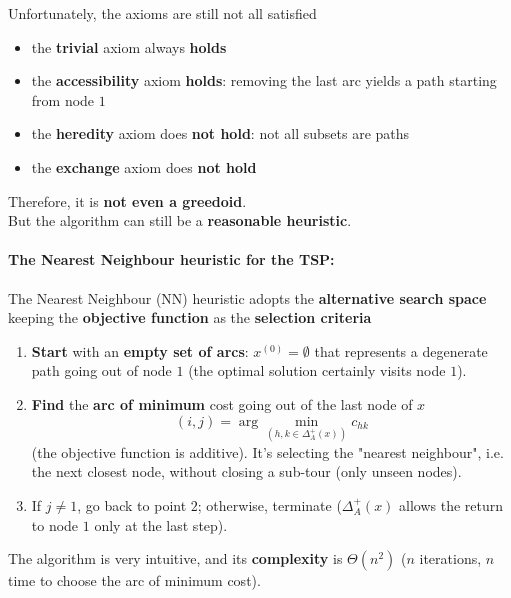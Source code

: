 \documentclass[11pt]{article}
\begin{document}
	Unfortunately, the axioms are still not all satisfied
	\begin{itemize}
		\item the \textbf{trivial} axiom always \textbf{holds}
		\item the \textbf{accessibility} axiom \textbf{holds}: removing the last arc yields a path starting from node $1$
		\item the \textbf{heredity} axiom does \textbf{not hold}: not all subsets are paths
		\item the \textbf{exchange} axiom does \textbf{not hold}
	\end{itemize}
	
	Therefore, it is \textbf{not even a greedoid}.\\
	
	But the algorithm can still be a \textbf{reasonable heuristic}.\\
	
	\newpage
	
	\paragraph{The Nearest Neighbour heuristic for the TSP:} The Nearest Neighbour (NN) heuristic adopts the \textbf{alternative search space} keeping the \textbf{objective function} as the \textbf{selection criteria}
	\begin{enumerate}
		\item \textbf{Start} with an \textbf{empty set of arcs}: $x^{(0)} = \emptyset$ that represents a degenerate path going out of node $1$ (the optimal solution certainly visits node $1$).\\
		
		\item \textbf{Find} the \textbf{arc of minimum} cost going out of the last node of $x$
		$$ (i,j) = \arg \min_{(h,k \in \Delta_A^+ (x))} c_{hk} $$
		(the objective function is additive). It's selecting the "nearest neighbour", i.e. the next closest node, without closing a sub-tour (only unseen nodes).\\
		
		\item If $j \neq 1$, go back to point $2$; otherwise, terminate ($\Delta_A^+ (x)$ allows the return to node $1$ only at the last step).\\
	\end{enumerate}
	
	The algorithm is very intuitive, and its \textbf{complexity} is $\Theta (n^2)$ ($n$ iterations, $n$ time to choose the arc of minimum cost).\\
	
\end{document}
